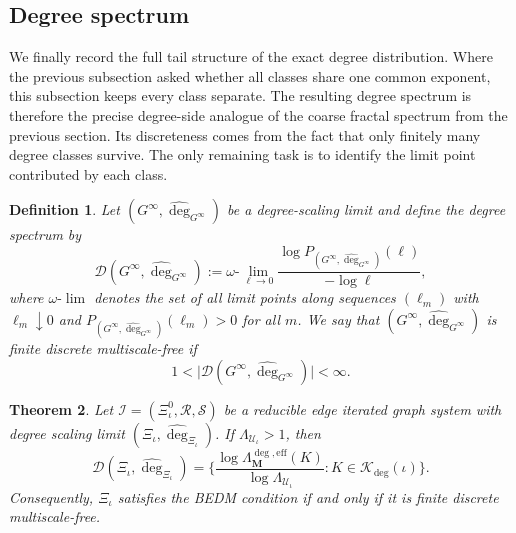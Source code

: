 \documentclass[12pt]{iopart}
\newtheorem{theorem}{Theorem}[section]
\newtheorem{definition}[theorem]{Definition}
\begin{document}
\subsection{Degree spectrum}

We finally record the full tail structure of the exact degree distribution.
Where the previous subsection asked whether all classes share one common exponent, this subsection keeps every class separate.
The resulting degree spectrum is therefore the precise degree-side analogue of the coarse fractal spectrum from the previous section.
Its discreteness comes from the fact that only finitely many degree classes survive.
The only remaining task is to identify the limit point contributed by each class.

\begin{definition}\label{def:degree-spectrum}
Let $(G^\infty,\hat\deg_{G^\infty})$ be a degree-scaling limit and define the
\emph{degree spectrum} by
\[
\mathscr D(G^\infty,\hat\deg_{G^\infty})
:=
\omega\text{-}\lim_{\ell\to 0}
\frac{
\log P_{(G^\infty,\hat\deg_{G^\infty})}(\ell)
}{
-\log \ell
},
\]
where $\omega\text{-}\lim$ denotes the set of all limit points along sequences
$(\ell_m)$ with $\ell_m\downarrow 0$ and
$P_{(G^\infty,\hat\deg_{G^\infty})}(\ell_m)>0$ for all $m$.
We say that $(G^\infty,\hat\deg_{G^\infty})$ is \emph{finite discrete multiscale-free} if
\[
1<\big|\mathscr D(G^\infty,\hat\deg_{G^\infty})\big|<\infty.
\]
\end{definition}

\begin{theorem}\label{thm:multiscalefree}
Let $\mathscr I=(\Xi_\iota^{0},\mathcal R,\mathcal S)$ be a reducible edge iterated graph system with degree scaling limit
$(\Xi_\iota,\hat{\deg}_{\Xi_\iota})$.
If $\Lambda_{\mathcal U_\iota}>1$, then
\[
\mathscr D(\Xi_\iota,\hat{\deg}_{\Xi_\iota})
=
\bigg\{
\frac{
\log \Lambda_{\mathbf M}^{\deg,\mathrm{eff}}(K)
}{
\log \Lambda_{\mathcal U_\iota}
}
:
K\in\mathscr K_{\deg}(\iota)
\bigg\}.
\]
Consequently, $\Xi_\iota$ satisfies the BEDM condition if and only if it is finite discrete multiscale-free.
\end{theorem}
\end{document}
